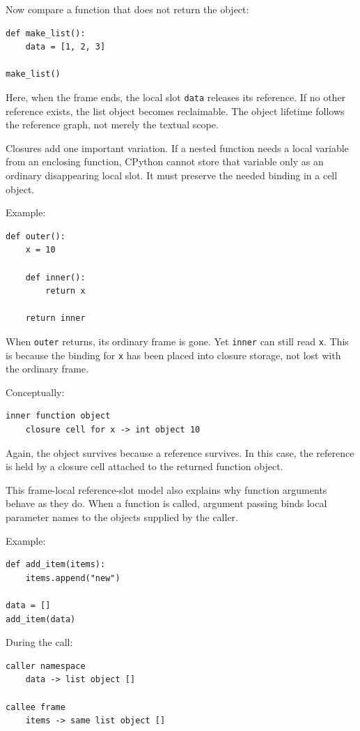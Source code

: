 Now compare a function that does not return the object:

\begin{verbatim}
def make_list():
    data = [1, 2, 3]

make_list()
\end{verbatim}

Here, when the frame ends, the local slot \texttt{data} releases its reference. If no other reference exists, the list object becomes reclaimable. The object lifetime follows the reference graph, not merely the textual scope.

Closures add one important variation. If a nested function needs a local variable from an enclosing function, CPython cannot store that variable only as an ordinary disappearing local slot. It must preserve the needed binding in a cell object.

Example:

\begin{verbatim}
def outer():
    x = 10

    def inner():
        return x

    return inner
\end{verbatim}

When \texttt{outer} returns, its ordinary frame is gone. Yet \texttt{inner} can still read \texttt{x}. This is because the binding for \texttt{x} has been placed into closure storage, not lost with the ordinary frame.

Conceptually:

\begin{verbatim}
inner function object
    closure cell for x -> int object 10
\end{verbatim}

Again, the object survives because a reference survives. In this case, the reference is held by a closure cell attached to the returned function object.

This frame-local reference-slot model also explains why function arguments behave as they do. When a function is called, argument passing binds local parameter names to the objects supplied by the caller.

Example:

\begin{verbatim}
def add_item(items):
    items.append("new")

data = []
add_item(data)
\end{verbatim}

During the call:

\begin{verbatim}
caller namespace
    data -> list object []

callee frame
    items -> same list object []
\end{verbatim}


